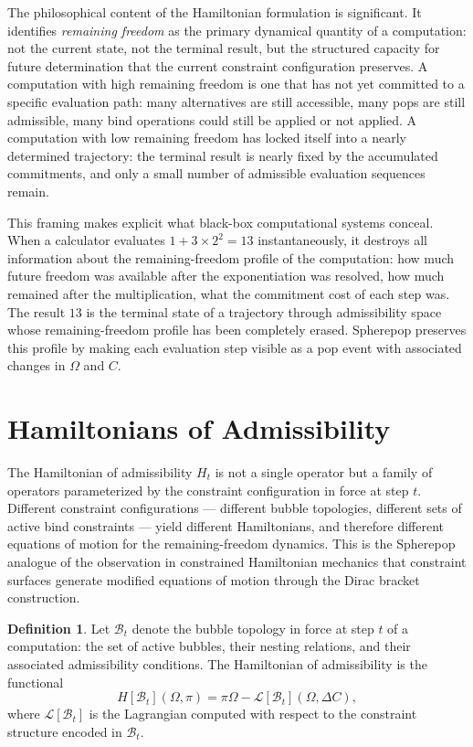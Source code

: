 \documentclass[12pt,openany]{book}
\theoremstyle{plain}
\theoremstyle{definition}
\newtheorem{definition}[theorem]{Definition}
\theoremstyle{remark}
\begin{document}
The philosophical content of the Hamiltonian formulation is significant. It identifies \emph{remaining freedom} as the primary dynamical quantity of a computation: not the current state, not the terminal result, but the structured capacity for future determination that the current constraint configuration preserves. A computation with high remaining freedom is one that has not yet committed to a specific evaluation path: many alternatives are still accessible, many pops are still admissible, many bind operations could still be applied or not applied. A computation with low remaining freedom has locked itself into a nearly determined trajectory: the terminal result is nearly fixed by the accumulated commitments, and only a small number of admissible evaluation sequences remain.

This framing makes explicit what black-box computational systems conceal. When a calculator evaluates $1 + 3 \times 2^2 = 13$ instantaneously, it destroys all information about the remaining-freedom profile of the computation: how much future freedom was available after the exponentiation was resolved, how much remained after the multiplication, what the commitment cost of each step was. The result $13$ is the terminal state of a trajectory through admissibility space whose remaining-freedom profile has been completely erased. Spherepop preserves this profile by making each evaluation step visible as a pop event with associated changes in $\Omega$ and $C$.

\section{Hamiltonians of Admissibility}

The Hamiltonian of admissibility $H_t$ is not a single operator but a family of operators parameterized by the constraint configuration in force at step $t$. Different constraint configurations — different bubble topologies, different sets of active bind constraints — yield different Hamiltonians, and therefore different equations of motion for the remaining-freedom dynamics. This is the Spherepop analogue of the observation in constrained Hamiltonian mechanics that constraint surfaces generate modified equations of motion through the Dirac bracket construction.

\begin{definition}
Let $\mathcal{B}_t$ denote the bubble topology in force at step $t$ of a computation: the set of active bubbles, their nesting relations, and their associated admissibility conditions. The Hamiltonian of admissibility is the functional
\[
  H[\mathcal{B}_t](\Omega, \pi) = \pi \Omega - \mathcal{L}[\mathcal{B}_t](\Omega, \Delta C),
\]
where $\mathcal{L}[\mathcal{B}_t]$ is the Lagrangian computed with respect to the constraint structure encoded in $\mathcal{B}_t$.
\end{definition}
\end{document}

